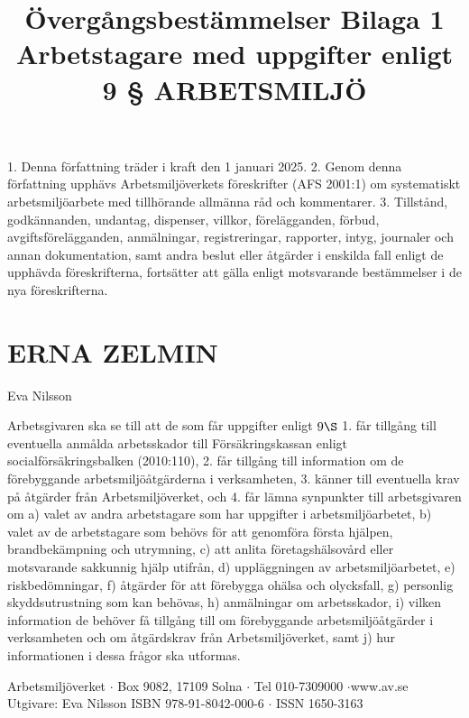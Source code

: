 \title{
Övergångsbestämmelser
}
1. Denna författning träder i kraft den 1 januari 2025.
2. Genom denna författning upphävs Arbetsmiljöverkets föreskrifter (AFS 2001:1) om systematiskt arbetsmiljöarbete med tillhörande allmänna råd och kommentarer.
3. Tillstånd, godkännanden, undantag, dispenser, villkor, förelägganden, förbud, avgiftsförelägganden, anmälningar, registreringar, rapporter, intyg, journaler och annan dokumentation, samt andra beslut eller åtgärder i enskilda fall enligt de upphävda föreskrifterna, fortsätter att gälla enligt motsvarande bestämmelser i de nya föreskrifterna.
\section*{ERNA ZELMIN}
Eva Nilsson

\title{
Bilaga 1 Arbetstagare med uppgifter enligt 9 §
}
Arbetsgivaren ska se till att de som får uppgifter enligt \(9 \S\)
1. får tillgång till eventuella anmålda arbetsskador till Försäkringskassan enligt socialförsäkringsbalken (2010:110),
2. får tillgång till information om de förebyggande arbetsmiljöåtgärderna i verksamheten,
3. känner till eventuella krav på åtgärder från Arbetsmiljöverket, och
4. får lämna synpunkter till arbetsgivaren om
a) valet av andra arbetstagare som har uppgifter i arbetsmiljöarbetet,
b) valet av de arbetstagare som behövs för att genomföra första hjälpen, brandbekämpning och utrymning,
c) att anlita företagshälsovård eller motsvarande sakkunnig hjälp utifrån,
d) uppläggningen av arbetsmiljöarbetet,
e) riskbedömningar,
f) åtgärder för att förebygga ohälsa och olycksfall,
g) personlig skyddsutrustning som kan behövas,
h) anmälningar om arbetsskador,
i) vilken information de behöver få tillgång till om förebyggande arbetsmiljöåtgärder i verksamheten och om åtgärdskrav från Arbetsmiljöverket, samt
j) hur informationen i dessa frågor ska utformas.

\title{
ARBETSMILJÖ
}

Arbetsmiljöverket \(\cdot\) Box 9082, 17109 Solna \(\cdot\) Tel 010-7309000 \(\cdot\)www.av.se
Utgivare: Eva Nilsson
ISBN 978-91-8042-000-6 \(\cdot\) ISSN 1650-3163